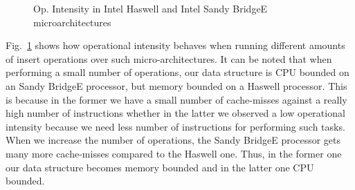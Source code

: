 \begin{figure}[t]
	\centering
	
	\caption{Op. Intensity in Intel Haswell and Intel Sandy BridgeE microarchitectures}
	\label{fig:haswell_ivybridge}
\end{figure}

Fig.~\ref{fig:haswell_ivybridge} shows how operational intensity behaves when running different amounts of insert operations over such micro-architectures. It can be noted that when performing a small number of operations, our data structure is CPU bounded on an Sandy BridgeE processor, but memory bounded on a Haswell processor. This is because in the former we have a small number of cache-misses against a really high number of instructions whether in the latter we observed a low operational intensity because we need less number of instructions for performing such tasks. When we increase the number of operations, the Sandy BridgeE processor gets many more cache-misses compared to the Haswell one. Thus, in the former one our data structure becomes memory bounded and in the latter one CPU bounded.

